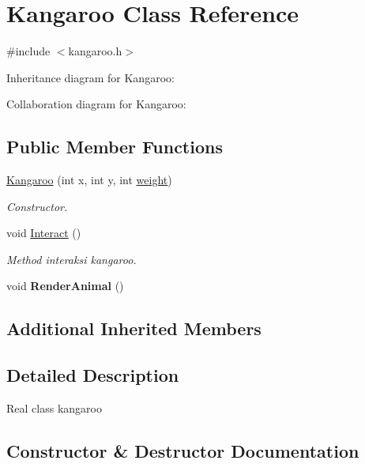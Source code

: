 \hypertarget{classKangaroo}{}\section{Kangaroo Class Reference}
\label{classKangaroo}


{\ttfamily \#include $<$kangaroo.\+h$>$}



Inheritance diagram for Kangaroo\+:


Collaboration diagram for Kangaroo\+:
\subsection*{Public Member Functions}
\begin{DoxyCompactItemize}
\item 
\hyperlink{classKangaroo_ad4dc1102585d0f1d64b768e14cb795db}{Kangaroo} (int x, int y, int \hyperlink{classAnimal_a9a3b22f243f7109c57f36b3c660feb6e}{weight})
\begin{DoxyCompactList}\small\item\em Constructor. \end{DoxyCompactList}\item 
void \hyperlink{classKangaroo_aec522c172d9c8df156dfe1a0d4a11e08}{Interact} ()\hypertarget{classKangaroo_aec522c172d9c8df156dfe1a0d4a11e08}{}\label{classKangaroo_aec522c172d9c8df156dfe1a0d4a11e08}

\begin{DoxyCompactList}\small\item\em Method interaksi kangaroo. \end{DoxyCompactList}\item 
void {\bfseries Render\+Animal} ()\hypertarget{classKangaroo_a4e76d1de7da4861bfb7f4277597babec}{}\label{classKangaroo_a4e76d1de7da4861bfb7f4277597babec}

\end{DoxyCompactItemize}
\subsection*{Additional Inherited Members}


\subsection{Detailed Description}
Real class kangaroo 

\subsection{Constructor \& Destructor Documentation}

